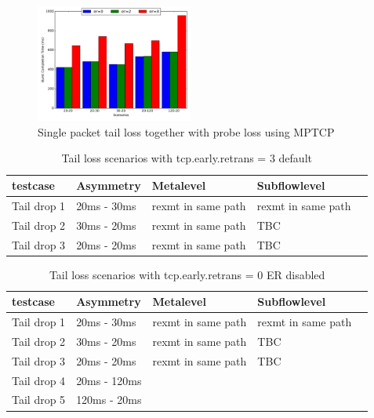 \documentclass[10pt,draftcls,twocolumn]{IEEEconf}
\begin{document}
\begin{figure}[!ht]
\begin{center}
\includegraphics[angle=0, width=0.46\textwidth, natwidth=578.16,natheight=433.62]{plots/1PP.pdf}
\caption{Single packet tail loss together with probe loss using MPTCP}\label{1pp}
\end{center}
\end{figure}





\begin{table}[!ht]
\centering
\caption{Tail loss scenarios with tcp.early.retrans = 3 default}
\label{ret3}
\begin{tabular}{|l|l|l|l|l|}
\hline
 testcase   & Asymmetry   & Metalevel          & Subflowlevel       &  \\\hline
Tail drop 1 & 20ms - 30ms & rexmt in same path & rexmt in same path &  \\\hline
Tail drop 2 & 30ms - 20ms & rexmt in same path & TBC                &  \\\hline
Tail drop 3 & 20ms - 20ms & rexmt in same path & TBC                &  \\ \hline
\end{tabular}
\end{table}





\begin{table}[!ht]
\centering
\caption{Tail loss scenarios with tcp.early.retrans = 0 ER disabled}
\label{ret0}
\begin{tabular}{|l|l|l|l|l|}
\hline
 testcase   & Asymmetry   & Metalevel          & Subflowlevel       &  \\\hline
Tail drop 1 & 20ms - 30ms & rexmt in same path & rexmt in same path &  \\\hline
Tail drop 2 & 30ms - 20ms & rexmt in same path & TBC                &  \\\hline
Tail drop 3 & 20ms - 20ms & rexmt in same path & TBC                & \\ \hline
Tail drop 4 & 20ms - 120ms &  			&		&  \\ \hline
Tail drop 5 & 120ms - 20ms &  			& 		& \\ \hline 
\end{tabular}
\end{table}
\end{document}
